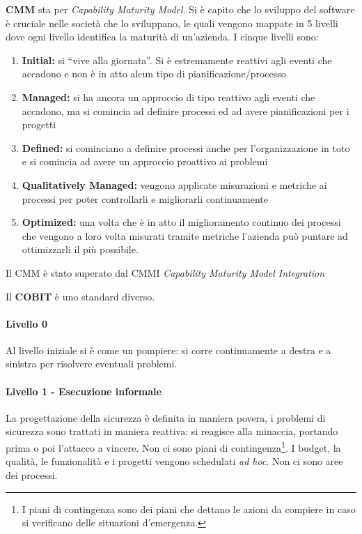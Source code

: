 \textbf{CMM} sta per \textit{Capability Maturity Model}. Si è capito che lo
sviluppo del software è cruciale nelle società che lo sviluppano, le quali vengono
mappate in 5 livelli dove ogni livello identifica la maturità di un'azienda.
I cinque livelli sono:
\begin{enumerate}
 \item \textbf{Initial:} si ``vive alla giornata''. Si è estremamente reattivi agli
eventi che accadono e non è in atto alcun tipo di pianificazione/processo
 \item \textbf{Managed:} si ha ancora un approccio di tipo reattivo agli eventi che
accadono, ma si comincia ad definire processi ed ad avere pianificazioni per i
progetti
 \item \textbf{Defined:} si cominciano a definire processi anche per l'organizzazione in
toto e si comincia ad avere un approccio proattivo ai problemi
 \item \textbf{Qualitatively Managed:} vengono applicate misurazioni e metriche ai
processi per poter controllarli e migliorarli continuamente
 \item \textbf{Optimized:} una volta che è in atto il miglioramento continuo dei
processi che vengono a loro volta misurati tramite metriche l'azienda può
puntare ad ottimizzarli il più possibile.
\end{enumerate}
Il CMM è stato superato dal CMMI \textit{Capability Maturity Model Integration}


Il \textbf{COBIT} è uno standard diverso.


\paragraph{Livello 0}

Al livello iniziale si è come un pompiere: si corre continuamente a destra e a
sinistra per risolvere eventuali problemi.

\paragraph{Livello 1 - Esecuzione informale}

La progettazione della sicurezza è definita in maniera povera, i problemi di
sicurezza sono trattati in maniera reattiva: si reagisce
alla minaccia, portando prima o poi l'attacco a vincere. Non ci sono piani di
contingenza\footnote{I piani di contingenza sono dei piani che dettano le azioni
da compiere in caso si verificano delle situazioni d'emergenza.}. I budget, la
qualità, le funzionalità e i progetti vengono schedulati \textit{ad hoc}.
Non ci sono aree dei processi.

